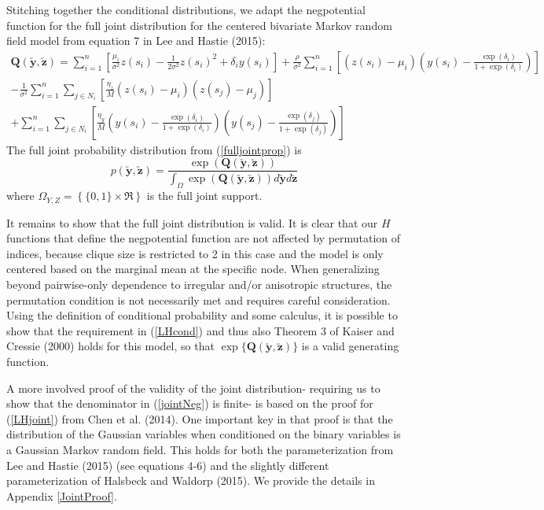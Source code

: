 \documentclass[12pt, a4paper, twoside]{article}
\begin{document}
Stitching together the conditional distributions, we adapt the negpotential function for the full joint distribution for the centered bivariate Markov random field model from equation 7 in Lee and Hastie (2015):
\begin{multline} \label{fullneg}
\boldsymbol{Q(\utilde{y},\utilde{z})} = \sum_{i = 1}^{n} \left[\frac{\mu_i}{\sigma^2}z(s_i) - \frac{1}{2\sigma^2}z(s_i)^2 + \delta_i y(s_i)\right] +  \frac{\rho}{\sigma^2} \sum_{i = 1}^{n} \left[\left(z(s_i)-\mu_i\right)\left(y(s_i) - \frac{\exp{(\delta_i)}}{1+\exp{(\delta_i)}}\right)\right]\\
-\frac{1}{\sigma^2}\sum_{i=1}^{n}\sum_{j\in N_i}\left[ \frac{\eta_z}{M}\left( z(s_i)-\mu_i\right)\left(z(s_j)-\mu_j \right)\right]\\
 + \sum_{i=1}^{n}\sum_{j\in N_i}\left[\frac{\eta_y}{M}\left(y(s_i) - \frac{\exp{(\delta_i)}}{1+\exp{(\delta_i)}}\right) \left(y(s_j) - \frac{\exp{(\delta_j)}}{1+\exp{(\delta_j)}}\right)\right]
\end{multline}
The full joint probability distribution from (\ref{fulljointprop}) is
\begin{equation} \label{jointNeg}
p(\boldsymbol{\utilde{y},\utilde{z}}) = \frac{\exp(\boldsymbol{Q(\utilde{y},\utilde{z})})}{\int_{\Omega}\exp(\boldsymbol{Q(\utilde{y},\utilde{z})})d\boldsymbol{\utilde{y}}d\boldsymbol{\utilde{z}}}
\end{equation}
where $\Omega_{Y,Z} = \left\lbrace \lbrace0,1\rbrace \times \Re \right\rbrace$ is the full joint support.

It remains to show that the full joint distribution is valid. It is clear that our $H$ functions that define the negpotential function are not affected by permutation of indices, because clique size is restricted to 2 in this case and the model is only centered based on the marginal mean at the specific node. When generalizing beyond pairwise-only dependence to irregular and/or anisotropic structures, the permutation condition is not necessarily met and requires careful consideration. Using the definition of conditional probability and some calculus, it is possible to show that the requirement in (\ref{LHcond}) and thus also Theorem 3 of Kaiser and Cressie (2000) holds for this model, so that $\exp\lbrace \boldsymbol{Q(\utilde{y},\utilde{z})}\rbrace$ is a valid generating function.

A more involved proof of the validity of the joint distribution- requiring us to show that the denominator in (\ref{jointNeg}) is finite- is based on the proof for (\ref{LHjoint}) from Chen et al. (2014). One important key in that proof is that the distribution of the Gaussian variables when conditioned on the binary variables is a Gaussian Markov random field. This holds for both the parameterization from Lee and Hastie (2015) (see equations 4-6) and the slightly different parameterization of Halsbeck and Waldorp (2015). We provide the details in Appendix \ref{JointProof}.
\end{document}
